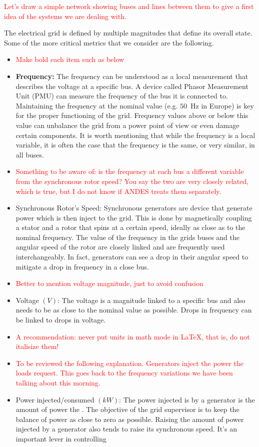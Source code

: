 \documentclass{article}
\begin{document}
\textcolor{red}{Let's draw a simple network showing buses and lines between them to give a first idea of the systems we are dealing with.}

The electrical grid is defined by multiple magnitudes that define its overall state. Some of the more critical metrics that we consider are the following.

\begin{itemize}
    \item \textcolor{red}{Make bold each item such as below}
    \item \textbf{Frequency:} The frequency can be understood as a local measurement that describes the voltage at a specific bus. A device called Phasor Measurement Unit (PMU) can measure the frequency of the bus it is connected to. Maintaining the frequency at the nominal value (e.g. $50$~Hz in Europe) is key for the proper functioning of the grid. Frequency values above or below this value can unbalance the grid from a power point of view or even damage certain components. It is worth mentioning that while the frequency is a local variable, it is often the case that the frequency is the same, or very similar, in all buses.   
    \item \textcolor{red}{Something to be aware of: is the frequency at each bus a different variable from the synchronous rotor speed? You say the two are very closely related, which is true, but I do not know if ANDES treats them separately.}
    \item Synchronous Rotor's Speed: Synchronous generators are device that generate power which is then inject to the grid. This is done by magnetically coupling a stator and a rotor that spins at a certain speed, ideally as close as to the nominal frequency. The value of the frequency in the grids buses and the angular speed of the rotor are closely linked and are frequently used interchangeably. In fact, generators can see a drop in their angular speed to mitigate a drop in frequency in a close bus.
    \item \textcolor{red}{Better to mention voltage magnitude, just to avoid confusion}
    \item Voltage $(V)$: The voltage is a magnitude linked to a specific bus and also needs to be as close to the nominal value as possible. Drops in frequency can be linked to drops in voltage.
    \item \textcolor{red}{A recommendation: never put units in math mode in LaTeX, that is, do not italisize them!}
    \item \textcolor{red}{To be reviewed the following explanation. Generators inject the power the loads request. This goes back to the frequency variations we have been talking about this morning.}
    \item Power injected/consumed $(kW)$: The power injected is by a generator is the amount of power the . The objective of the grid supervisor is to keep the balance of power as close to zero as possible. Raising the amount of power injected by a generator also tends to raise its synchronous speed. It's an important lever in controlling  
\end{itemize}
\end{document}
